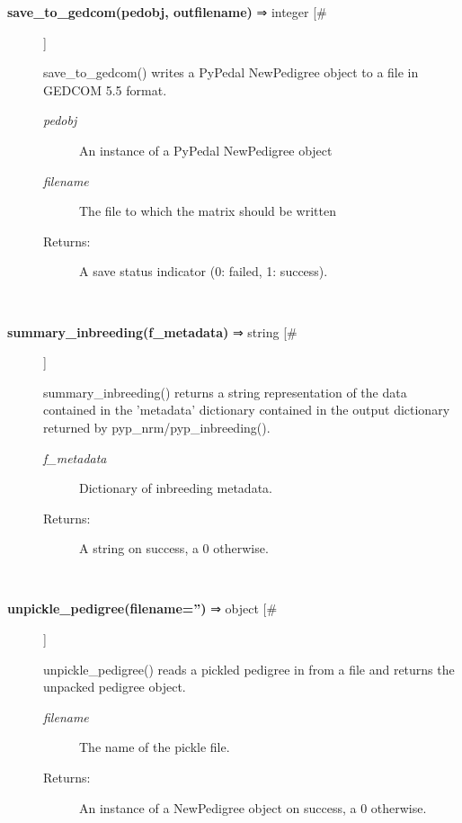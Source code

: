 \documentclass{article}
\begin{document}
\begin{description}
\item[\textbf{save\_to\_gedcom(pedobj, outfilename)} ⇒ integer [\#]
]
\par save\_to\_gedcom() writes a PyPedal NewPedigree object to a file in
GEDCOM 5.5 format.
\begin{description}
\item[\textit{pedobj}
]
An instance of a PyPedal NewPedigree object
\item[\textit{filename}
]
The file to which the matrix should be written
\item[Returns:
]
A save status indicator (0: failed, 1: success).
\end{description}\\

\item[\textbf{summary\_inbreeding(f\_metadata)} ⇒ string [\#]
]
\par summary\_inbreeding() returns a string representation of the data contained in
the 'metadata' dictionary contained in the output dictionary returned by
pyp\_nrm/pyp\_inbreeding().
\begin{description}
\item[\textit{f\_metadata}
]
Dictionary of inbreeding metadata.
\item[Returns:
]
A string on success, a 0 otherwise.
\end{description}\\

\item[\textbf{unpickle\_pedigree(filename='')} ⇒ object [\#]
]
\par unpickle\_pedigree() reads a pickled pedigree in from a file and returns the unpacked
pedigree object.
\begin{description}
\item[\textit{filename}
]
The name of the pickle file.
\item[Returns:
]
An instance of a NewPedigree object on success, a 0 otherwise.
\end{description}\\

\end{description}
\end{document}
